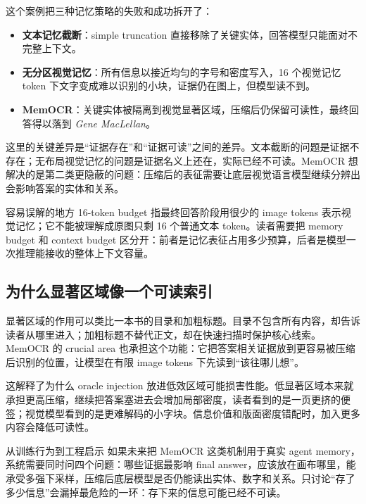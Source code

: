 这个案例把三种记忆策略的失败和成功拆开了：

\begin{itemize}
  \item \textbf{文本记忆截断}：simple truncation 直接移除了关键实体，回答模型只能面对不完整上下文。
  \item \textbf{无分区视觉记忆}：所有信息以接近均匀的字号和密度写入，16 个视觉记忆 token 下文字变成难以识别的小块，证据仍在图上，但模型读不到。
  \item \textbf{MemOCR}：关键实体被隔离到视觉显著区域，压缩后仍保留可读性，最终回答得以落到 \textit{Gene MacLellan}。
\end{itemize}

这里的关键差异是“证据存在”和“证据可读”之间的差异。文本截断的问题是证据不存在；无布局视觉记忆的问题是证据名义上还在，实际已经不可读。MemOCR 想解决的是第二类更隐蔽的问题：压缩后的表征需要让底层视觉语言模型继续分辨出会影响答案的实体和关系。

\begin{warningbox}{容易误解的地方}
16-token budget 指最终回答阶段用很少的 image tokens 表示视觉记忆；它不能被理解成原图只剩 16 个普通文本 token。读者需要把 memory budget 和 context budget 区分开：前者是记忆表征占用多少预算，后者是模型一次推理能接收的整体上下文容量。
\end{warningbox}

\subsection{为什么显著区域像一个可读索引}

显著区域的作用可以类比一本书的目录和加粗标题。目录不包含所有内容，却告诉读者从哪里进入；加粗标题不替代正文，却在快速扫描时保护核心线索。MemOCR 的 crucial area 也承担这个功能：它把答案相关证据放到更容易被压缩后识别的位置，让模型在有限 image tokens 下先读到“该往哪儿想”。

这解释了为什么 oracle injection 放进低效区域可能损害性能。低显著区域本来就承担更高压缩，继续把答案塞进去会增加局部密度，读者看到的是一页更挤的便签；视觉模型看到的是更难解码的小字块。信息价值和版面密度错配时，加入更多内容会降低可读性。

\begin{knowledgebox}{从训练行为到工程启示}
如果未来把 MemOCR 这类机制用于真实 agent memory，系统需要同时问四个问题：哪些证据最影响 final answer，应该放在画布哪里，能承受多强下采样，压缩后底层模型是否仍能读出实体、数字和关系。只讨论“存了多少信息”会漏掉最危险的一环：存下来的信息可能已经不可读。
\end{knowledgebox}

